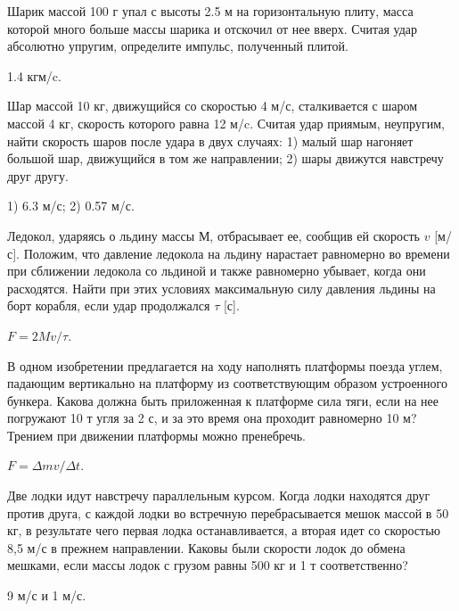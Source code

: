 \begin{ex} %
Шарик  массой 100 г упал с высоты 2.5 м на горизонтальную плиту, масса которой много больше массы шарика и отскочил от нее вверх. Считая удар абсолютно упругим, определите импульс, полученный плитой.
\begin{ans}
1.4 кгм/c.
\end{ans}
\end{ex}

\begin{ex} %
Шар массой 10 кг, движущийся со скоростью 4 м/с, сталкивается с шаром массой 4 кг, скорость которого равна 12 м/c. Считая удар приямым, неупругим, найти скорость шаров после удара в двух случаях: 1) малый шар нагоняет большой шар, движущийся в том же направлении; 2) шары движутся навстречу друг другу.
\begin{ans}
1) 6.3 м/с; 2) 0.57 м/с.
\end{ans}
\end{ex}


\begin{ex} %
Ледокол, ударяясь о льдину массы $М$, отбрасывает ее, сообщив ей скорость $v$ [м/с]. Положим, что давление ледокола на льдину нарастает равномерно во времени при сближении ледокола со льдиной и также равномерно убывает, когда они расходятся. Найти при этих условиях максимальную силу давления льдины на борт корабля, если удар продолжался $\tau$ [с].
\begin{ans}
$F = 2Mv/\tau$.
\end{ans}
\end{ex}

\begin{ex} %
В одном изобретении предлагается на ходу наполнять платформы поезда углем, падающим вертикально на платформу из соответствующим образом устроенного бункера. Какова должна быть приложенная к платформе сила тяги, если на нее погружают 10 т угля за 2 с, и за это время она проходит равномерно 10 м? Трением при движении платформы можно пренебречь.
\begin{ans}
$F = \Delta m v/ \Delta t$.
\end{ans}
\end{ex}

\begin{ex} %
Две лодки идут навстречу параллельным курсом. Когда лодки находятся друг против друга, с каждой лодки во встречную перебрасывается мешок массой в 50 кг, в результате чего первая лодка останавливается, а вторая идет со скоростью 8,5 м/с в прежнем направлении. Каковы были скорости лодок до обмена мешками, если массы лодок с грузом равны 500 кг и 1 т соответственно?
\begin{ans}
9 м/с и 1 м/с.
\end{ans}
\end{ex}

